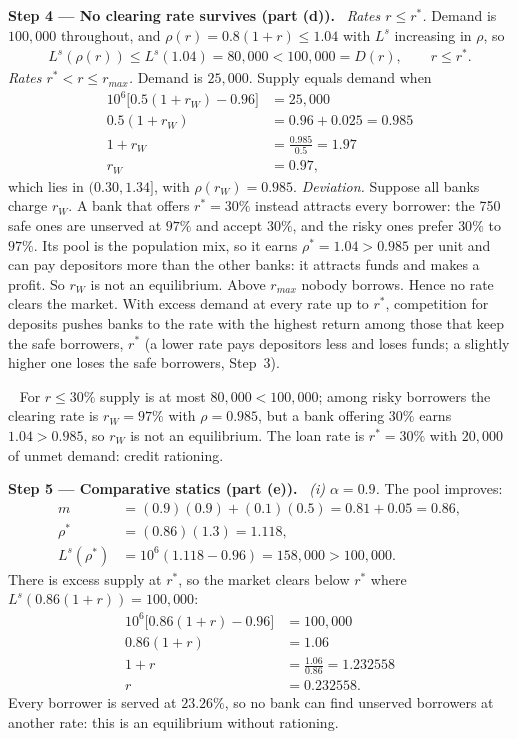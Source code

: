 \documentclass[11pt,a4paper]{article}
\newcommand{\step}[2]{\par\medskip\noindent\textbf{Step #1 --- #2.}~}
\newcommand{\answer}[1]{\par\smallskip\noindent\fbox{\textbf{Answer #1.}}~}
\begin{document}
\step{4}{No clearing rate survives (part (d))} \emph{Rates $r\le r^*$.} Demand is $100{,}000$ throughout, and $\rho(r)=0.8(1+r)\le1.04$ with $L^s$ increasing in $\rho$, so
\begin{align}
  L^s(\rho(r)) \le L^s(1.04) = 80{,}000 < 100{,}000 = D(r), \qquad r\le r^*. \nonumber
\end{align}
\emph{Rates $r^*<r\le r_{max}$.} Demand is $25{,}000$. Supply equals demand when
\begin{align}
  10^6\bigl[0.5(1+r_W)-0.96\bigr] &= 25{,}000 \nonumber\\
  0.5(1+r_W) &= 0.96+0.025 = 0.985 \nonumber\\
  1+r_W &= \frac{0.985}{0.5} = 1.97 \nonumber\\
  r_W &= 0.97, \label{t3e17-rW}
\end{align}
which lies in $(0.30,1.34]$, with $\rho(r_W)=0.985$. \emph{Deviation.} Suppose all banks charge $r_W$. A bank that offers $r^*=30\%$ instead attracts every borrower: the 750 safe ones are unserved at $97\%$ and accept $30\%$, and the risky ones prefer $30\%$ to $97\%$. Its pool is the population mix, so it earns $\rho^*=1.04>0.985$ per unit and can pay depositors more than the other banks: it attracts funds and makes a profit. So $r_W$ is not an equilibrium. Above $r_{max}$ nobody borrows. Hence no rate clears the market. With excess demand at every rate up to $r^*$, competition for deposits pushes banks to the rate with the highest return among those that keep the safe borrowers, $r^*$ (a lower rate pays depositors less and loses funds; a slightly higher one loses the safe borrowers, Step~3).

\answer{(d)} For $r\le30\%$ supply is at most $80{,}000<100{,}000$; among risky borrowers the clearing rate is $r_W=97\%$ with $\rho=0.985$, but a bank offering $30\%$ earns $1.04>0.985$, so $r_W$ is not an equilibrium. The loan rate is $r^*=30\%$ with $20{,}000$ of unmet demand: credit rationing.

\step{5}{Comparative statics (part (e))} \emph{(i) $\alpha=0.9$.} The pool improves:
\begin{align}
  m &= (0.9)(0.9)+(0.1)(0.5) = 0.81+0.05 = 0.86, \nonumber\\
  \rho^* &= (0.86)(1.3) = 1.118, \nonumber\\
  L^s(\rho^*) &= 10^6(1.118-0.96) = 158{,}000 > 100{,}000. \nonumber
\end{align}
There is excess supply at $r^*$, so the market clears below $r^*$ where $L^s(0.86(1+r))=100{,}000$:
\begin{align}
  10^6\bigl[0.86(1+r)-0.96\bigr] &= 100{,}000 \nonumber\\
  0.86(1+r) &= 1.06 \nonumber\\
  1+r &= \frac{1.06}{0.86} = 1.232558 \nonumber\\
  r &= 0.232558. \nonumber
\end{align}
Every borrower is served at $23.26\%$, so no bank can find unserved borrowers at another rate: this is an equilibrium without rationing.
\end{document}
